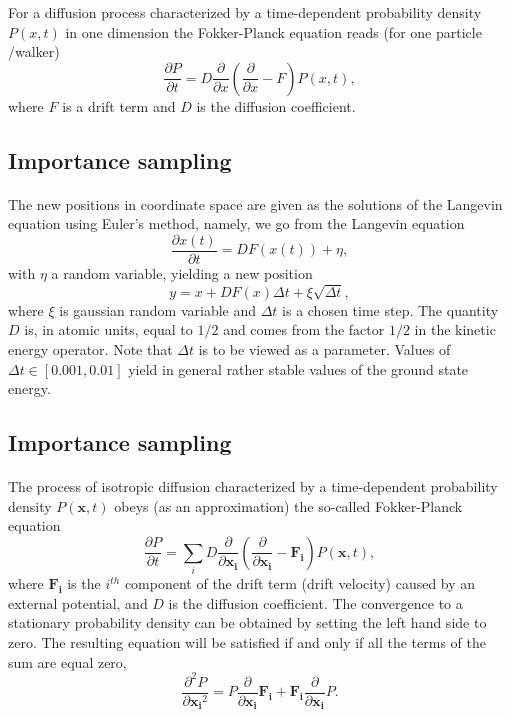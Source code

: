 \documentclass[%
twoside,                 %
final,                   %
10pt]{article}
\begin{document}
For a diffusion process characterized by a time-dependent probability density $P(x,t)$ in one dimension the Fokker-Planck
equation reads (for one particle /walker) 
\[
   \frac{\partial P}{\partial t} = D\frac{\partial }{\partial x}\left(\frac{\partial }{\partial x} -F\right)P(x,t),
\]
where $F$ is a drift term and $D$ is the diffusion coefficient.




\subsection*{Importance sampling}

\paragraph{}
The new positions in coordinate space are given as the solutions of the Langevin equation using Euler's method, namely,
we go from the Langevin equation
\[ 
   \frac{\partial x(t)}{\partial t} = DF(x(t)) +\eta,
\]
with $\eta$ a random variable,
yielding a new position 
\[
   y = x+DF(x)\Delta t +\xi\sqrt{\Delta t},
\]
where $\xi$ is gaussian random variable and $\Delta t$ is a chosen time step. 
The quantity $D$ is, in atomic units, equal to $1/2$ and comes from the factor $1/2$ in the kinetic energy operator. Note that $\Delta t$ is to be viewed as a parameter. Values of $\Delta t \in [0.001,0.01]$ yield in general rather stable values of the ground state energy.



\subsection*{Importance sampling}

\paragraph{}
The process of isotropic diffusion characterized by a time-dependent probability density $P(\mathbf{x},t)$ obeys (as an approximation) the so-called Fokker-Planck equation 
\[
   \frac{\partial P}{\partial t} = \sum_i D\frac{\partial }{\partial \mathbf{x_i}}\left(\frac{\partial }{\partial \mathbf{x_i}} -\mathbf{F_i}\right)P(\mathbf{x},t),
\]
where $\mathbf{F_i}$ is the $i^{th}$ component of the drift term (drift velocity) caused by an external potential, and $D$ is the diffusion coefficient. The convergence to a stationary probability density can be obtained by setting the left hand side to zero. The resulting equation will be satisfied if and only if all the terms of the sum are equal zero,
\[
\frac{\partial^2 P}{\partial {\mathbf{x_i}^2}} = P\frac{\partial}{\partial {\mathbf{x_i}}}\mathbf{F_i} + \mathbf{F_i}\frac{\partial}{\partial {\mathbf{x_i}}}P.
\]
\end{document}
